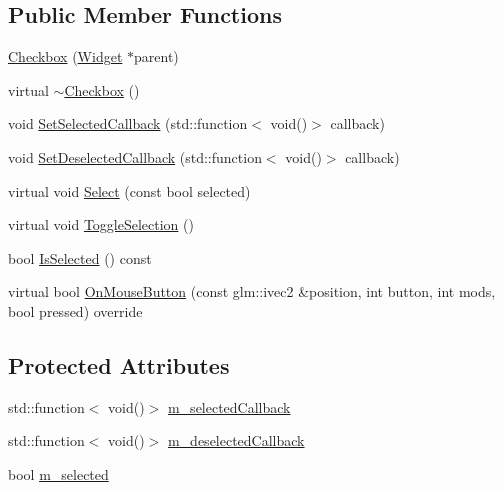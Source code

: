 \subsection*{Public Member Functions}
\begin{DoxyCompactItemize}
\item 
\mbox{\hyperlink{classec__gui_1_1_checkbox_ae5f2c4a6e7ea07282d4770be2486525c}{Checkbox}} (\mbox{\hyperlink{classec__gui_1_1_widget}{Widget}} $\ast$parent)
\item 
virtual \mbox{\hyperlink{classec__gui_1_1_checkbox_a819cbb2a47519c323bffb47a4b629818}{$\sim$\+Checkbox}} ()
\item 
void \mbox{\hyperlink{classec__gui_1_1_checkbox_acea0dfc9db5670da3de8a24913bd4be3}{Set\+Selected\+Callback}} (std\+::function$<$ void()$>$ callback)
\item 
void \mbox{\hyperlink{classec__gui_1_1_checkbox_a1c4f89f765e7e06779d7066ec8c6fd6d}{Set\+Deselected\+Callback}} (std\+::function$<$ void()$>$ callback)
\item 
virtual void \mbox{\hyperlink{classec__gui_1_1_checkbox_ac3a789d2acb2da6067f1ed4b7bd43317}{Select}} (const bool selected)
\item 
virtual void \mbox{\hyperlink{classec__gui_1_1_checkbox_a8bfa25b77b1c3e8e0cffcd85f77c0466}{Toggle\+Selection}} ()
\item 
bool \mbox{\hyperlink{classec__gui_1_1_checkbox_ac21f8cc9658affca8c044751d786729d}{Is\+Selected}} () const
\item 
virtual bool \mbox{\hyperlink{classec__gui_1_1_checkbox_a0c109bc8ddf9b272857e71cec9b63b49}{On\+Mouse\+Button}} (const glm\+::ivec2 \&position, int button, int mods, bool pressed) override
\end{DoxyCompactItemize}
\subsection*{Protected Attributes}
\begin{DoxyCompactItemize}
\item 
std\+::function$<$ void()$>$ \mbox{\hyperlink{classec__gui_1_1_checkbox_ae1f5d67ca2f0e54930ac1a7fcf39fe05}{m\+\_\+selected\+Callback}}
\item 
std\+::function$<$ void()$>$ \mbox{\hyperlink{classec__gui_1_1_checkbox_a67f81ba535c95503bb2f8b66db35e594}{m\+\_\+deselected\+Callback}}
\item 
bool \mbox{\hyperlink{classec__gui_1_1_checkbox_aa5c7879c4d6422bd5c0fd96edc484a88}{m\+\_\+selected}}
\end{DoxyCompactItemize}
